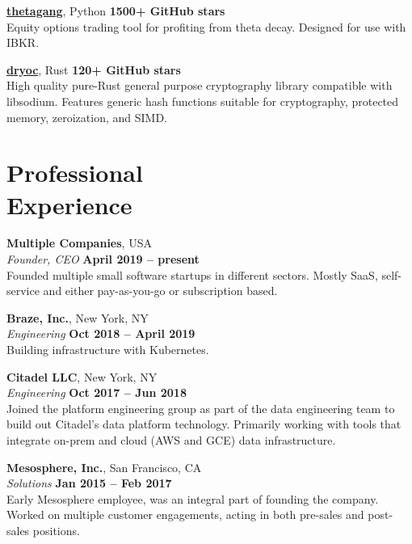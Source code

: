 \documentclass[margin,line]{resume}
\begin{document}
\begin{resume}
    \href{https://github.com/brndnmtthws/thetagang}{\textbf{thetagang}}, Python \hfill \textbf{1500+ GitHub stars}\\
    Equity options trading tool for profiting from theta decay. Designed for use
    with IBKR.

    \href{https://github.com/brndnmtthws/dryoc}{\textbf{dryoc}}, Rust \hfill \textbf{120+ GitHub stars}\\
    High quality pure-Rust general purpose cryptography library compatible with
    libsodium.  Features generic hash functions suitable for cryptography,
    protected memory, zeroization, and SIMD.

    \vspace{3mm}

    \section{\mysidestyle Professional\\Experience}

    \textbf{Multiple Companies}, USA \vspace{2mm}\\\vspace{1mm}%
    \textsl{Founder, CEO} \hfill \textbf{April 2019 -- present}\\
    Founded multiple small software startups in different sectors. Mostly SaaS,
    self-service and either pay-as-you-go or subscription based.

    \textbf{Braze, Inc.}, New York, NY \vspace{2mm}\\\vspace{1mm}%
    \textsl{Engineering} \hfill \textbf{Oct 2018 -- April 2019}\\
    Building infrastructure with Kubernetes.

    \textbf{Citadel LLC}, New York, NY \vspace{2mm}\\\vspace{1mm}%
    \textsl{Engineering} \hfill \textbf{Oct 2017 -- Jun 2018}\\
    Joined the platform engineering group as part of the data engineering
    team to build out Citadel's data platform technology. Primarily working
    with tools that integrate on-prem and cloud (AWS and GCE) data
    infrastructure.

    \textbf{Mesosphere, Inc.}, San Francisco, CA \vspace{2mm}\\\vspace{1mm}%
    \textsl{Solutions} \hfill \textbf{Jan 2015 -- Feb 2017}\\
    Early Mesosphere employee, was an integral part of founding the company.
    Worked on multiple customer engagements, acting in both pre-sales and
    post-sales positions.


\end{resume}
\end{document}
